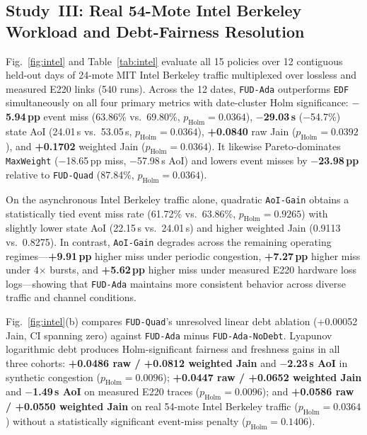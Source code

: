 \documentclass[journal]{IEEEtran}
\begin{document}
\subsection{Study~III: Real 54-Mote Intel Berkeley Workload and Debt-Fairness Resolution}

Fig.~\ref{fig:intel} and Table~\ref{tab:intel} evaluate all 15 policies over 12 contiguous held-out days of 24-mote MIT Intel Berkeley traffic multiplexed over lossless and measured E220 links (540 runs). Across the 12 dates, \texttt{FUD-Ada} outperforms \texttt{EDF} simultaneously on all four primary metrics with date-cluster Holm significance: \textbf{$-$5.94\,pp} event miss (63.86\% vs.\ 69.80\%, $p_{\text{Holm}}{=}0.0364$), \textbf{$-$29.03\,s} ($-$54.7\%) state AoI (24.01\,s vs.\ 53.05\,s, $p_{\text{Holm}}{=}0.0364$), \textbf{+0.0840} raw Jain ($p_{\text{Holm}}{=}0.0392$), and \textbf{+0.1702} weighted Jain ($p_{\text{Holm}}{=}0.0364$). It likewise Pareto-dominates \texttt{MaxWeight} ($-$18.65\,pp miss, $-$57.98\,s AoI) and lowers event misses by \textbf{$-$23.98\,pp} relative to \texttt{FUD-Quad} (87.84\%, $p_{\text{Holm}}{=}0.0364$).

On the asynchronous Intel Berkeley traffic alone, quadratic \texttt{AoI-Gain} obtains a statistically tied event miss rate (61.72\% vs.\ 63.86\%, $p_{\text{Holm}}{=}0.9265$) with slightly lower state AoI (22.15\,s vs.\ 24.01\,s) and higher weighted Jain (0.9113 vs.\ 0.8275). In contrast, \texttt{AoI-Gain} degrades across the remaining operating regimes---\textbf{+9.91\,pp} higher miss under periodic congestion, \textbf{+7.27\,pp} higher miss under 4$\times$ bursts, and \textbf{+5.62\,pp} higher miss under measured E220 hardware loss logs---showing that \texttt{FUD-Ada} maintains more consistent behavior across diverse traffic and channel conditions.

Fig.~\ref{fig:intel}(b) compares \texttt{FUD-Quad}'s unresolved linear debt ablation (+0.00052 Jain, CI spanning zero) against \texttt{FUD-Ada} minus \texttt{FUD-Ada-NoDebt}. Lyapunov logarithmic debt produces Holm-significant fairness and freshness gains in all three cohorts: \textbf{+0.0486 raw / +0.0812 weighted Jain} and \textbf{$-$2.23\,s AoI} in synthetic congestion ($p_{\text{Holm}}{=}0.0096$); \textbf{+0.0447 raw / +0.0652 weighted Jain} and \textbf{$-$1.49\,s AoI} on measured E220 traces ($p_{\text{Holm}}{=}0.0096$); and \textbf{+0.0586 raw / +0.0550 weighted Jain} on real 54-mote Intel Berkeley traffic ($p_{\text{Holm}}{=}0.0364$) without a statistically significant event-miss penalty ($p_{\text{Holm}}{=}0.1406$).
\end{document}
